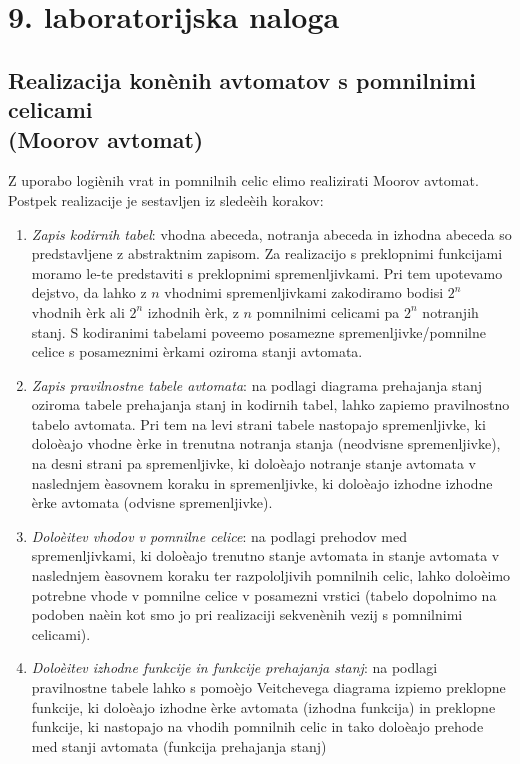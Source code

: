 \chapter*{9. laboratorijska naloga}
\section*{Realizacija konènih avtomatov s pomnilnimi celicami\\(Moorov avtomat)}

Z uporabo logiènih vrat in pomnilnih celic elimo realizirati Moorov avtomat. Postpek realizacije je sestavljen iz sledeèih korakov:
\begin{enumerate}
\item \emph{Zapis kodirnih tabel}: vhodna abeceda, notranja abeceda in izhodna abeceda so predstavljene z abstraktnim zapisom. Za realizacijo s preklopnimi funkcijami moramo le-te predstaviti s preklopnimi spremenljivkami. Pri tem upotevamo dejstvo, da lahko z $n$ vhodnimi spremenljivkami zakodiramo bodisi $2^n$ vhodnih èrk ali $2^n$ izhodnih èrk, z $n$ pomnilnimi celicami pa $2^n$ notranjih stanj. S kodiranimi tabelami poveemo posamezne spremenljivke/pomnilne celice s posameznimi èrkami oziroma stanji avtomata.
\item \emph{Zapis pravilnostne tabele avtomata}: na podlagi diagrama prehajanja stanj oziroma tabele prehajanja stanj in kodirnih tabel, lahko zapiemo pravilnostno tabelo avtomata. Pri tem na levi strani tabele nastopajo spremenljivke, ki doloèajo vhodne èrke in trenutna notranja stanja (neodvisne spremenljivke), na desni strani pa spremenljivke, ki doloèajo notranje stanje avtomata v naslednjem èasovnem koraku in spremenljivke, ki doloèajo izhodne izhodne èrke avtomata (odvisne spremenljivke).
\item \emph{Doloèitev vhodov v pomnilne celice}: na podlagi prehodov med spremenljivkami, ki doloèajo trenutno stanje avtomata in stanje avtomata v naslednjem èasovnem koraku ter razpololjivih pomnilnih celic, lahko doloèimo potrebne vhode v pomnilne celice v posamezni vrstici (tabelo dopolnimo na podoben naèin kot smo jo pri realizaciji sekvenènih vezij s pomnilnimi celicami). 
\item \emph{Doloèitev izhodne funkcije in funkcije prehajanja stanj}: na podlagi pravilnostne tabele lahko s pomoèjo Veitchevega diagrama izpiemo preklopne funkcije, ki doloèajo izhodne èrke avtomata (izhodna funkcija) in preklopne funkcije, ki nastopajo na vhodih pomnilnih celic in tako doloèajo prehode med stanji avtomata (funkcija prehajanja stanj)
\end{enumerate}

